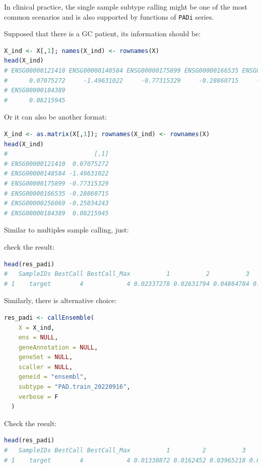 \documentclass[
  12pt,
]{book}
\newcommand{\passthrough}[1]{#1}
\begin{document}
In clinical practice, the single sample subtype calling might be one of the most common scenarios and is also supported by functions of \passthrough{\lstinline!PADi!} series.

Supposed that there is a GC patient, its information should be:

\begin{lstlisting}[language=R]
X_ind <- X[,1]; names(X_ind) <- rownames(X)
head(X_ind)
# ENSG00000121410 ENSG00000148584 ENSG00000175899 ENSG00000166535 ENSG00000256069 
#      0.07075272     -1.49631022     -0.77315329     -0.28860715     -0.25034243 
# ENSG00000184389 
#      0.08215945
\end{lstlisting}

Or it can also be another format:

\begin{lstlisting}[language=R]
X_ind <- as.matrix(X[,1]); rownames(X_ind) <- rownames(X)
head(X_ind)
#                        [,1]
# ENSG00000121410  0.07075272
# ENSG00000148584 -1.49631022
# ENSG00000175899 -0.77315329
# ENSG00000166535 -0.28860715
# ENSG00000256069 -0.25034243
# ENSG00000184389  0.08215945
\end{lstlisting}

Similar to multiples sample calling, just:

check the result:

\begin{lstlisting}[language=R]
head(res_padi)
#   SampleIDs BestCall BestCall_Max          1          2          3         4
# 1    target        4            4 0.02337278 0.02631794 0.04864784 0.3336484
\end{lstlisting}

Similarly, there is alternative choice:

\begin{lstlisting}[language=R]
res_padi <- callEnsemble(
    X = X_ind,
    ens = NULL,
    geneAnnotation = NULL,
    geneSet = NULL,
    scaller = NULL,
    geneid = "ensembl",
    subtype = "PAD.train_20220916",
    verbose = F
  )
\end{lstlisting}

Check the result:

\begin{lstlisting}[language=R]
head(res_padi)
#   SampleIDs BestCall BestCall_Max          1         2          3         4
# 1    target        4            4 0.01338872 0.0162452 0.03965218 0.8052567
\end{lstlisting}
\end{document}
